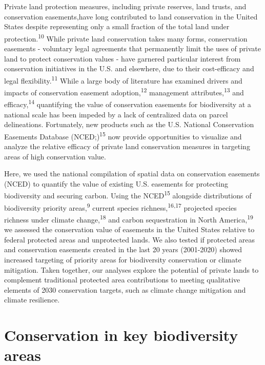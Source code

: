 \documentclass[3p]{elsarticle} %
\begin{document}
Private land protection measures, including private reserves, land
trusts, and conservation easements,have long contributed to land
conservation in the United States despite representing only a small
fraction of the total land under protection.\textsuperscript{10} While
private land conservation takes many forms, conservation easements -
voluntary legal agreements that permanently limit the uses of private
land to protect conservation values - have garnered particular interest
from conservation initiatives in the U.S. and elsewhere, due to their
cost-efficacy and legal flexibility.\textsuperscript{11} While a large
body of literature has examined drivers and impacts of conservation
easement adoption,\textsuperscript{12} management
attributes,\textsuperscript{13} and efficacy,\textsuperscript{14}
quantifying the value of conservation easements for biodiversity at a
national scale has been impeded by a lack of centralized data on parcel
delineations. Fortunately, new products such as the U.S. National
Conservation Easements Database (NCED;)\textsuperscript{15} now provide
opportunities to visualize and analyze the relative efficacy of private
land conservation measures in targeting areas of high conservation
value.

Here, we used the national compilation of spatial data on conservation
easements (NCED) to quantify the value of existing U.S. easements for
protecting biodiversity and securing carbon. Using the
NCED\textsuperscript{15} alongside distributions of biodiversity
priority areas,\textsuperscript{9} current species
richness,\textsuperscript{16,17} projected species richness under
climate change,\textsuperscript{18} and carbon sequestration in North
America,\textsuperscript{19} we assessed the conservation value of
easements in the United States relative to federal protected areas and
unprotected lands. We also tested if protected areas and conservation
easements created in the last 20 years (2001-2020) showed increased
targeting of priority areas for biodiversity conservation or climate
mitigation. Taken together, our analyses explore the potential of
private lands to complement traditional protected area contributions to
meeting qualitative elements of 2030 conservation targets, such as
climate change mitigation and climate resilience.

\hypertarget{conservation-in-key-biodiversity-areas}{%
\section{Conservation in key biodiversity
areas}\label{conservation-in-key-biodiversity-areas}}
\end{document}
